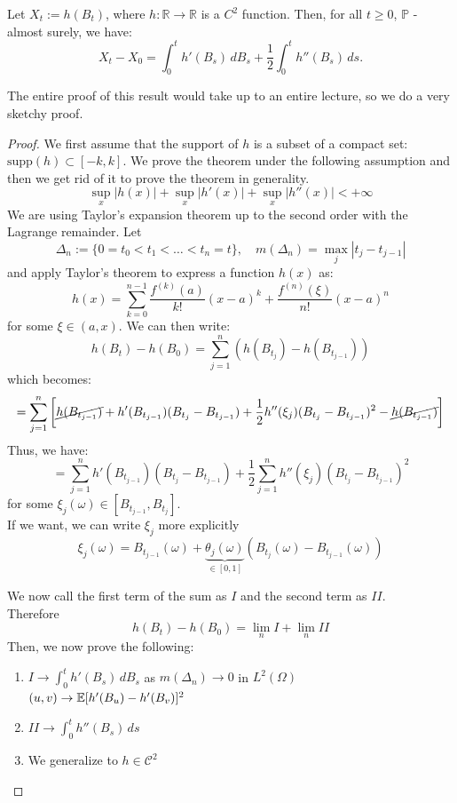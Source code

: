 \begin{ThBox}
    \begin{Th} 
     Let \( X_t := h(B_t) \), where \( h: \mathbb{R} \to \mathbb{R} \) is a \( C^2 \) function. Then, for all \( t \geq 0 \), $\mathbb{P}$ - almost surely, we have:
\[
X_t - X_0 = \int_0^t h'(B_s) \, dB_s + \frac{1}{2} \int_0^t h''(B_s) \, ds.
\]
\end{Th}
\end{ThBox}
The entire proof of this result would take up to an entire lecture, so we do a very sketchy proof.
\begin{ProofBox}
    \begin{proof}
    We first assume that the support of $h$ is a subset of a compact set: $\text{supp}(h) \subset [-k,k]$. We prove the theorem under the following assumption and then we get rid of it to prove the theorem in generality. 
    \begin{equation*}
        \sup_x |h(x)| + \sup_x |h'(x)| + \sup_x |h''(x)| < +\infty
    \end{equation*}
    We are using Taylor's expansion theorem up to the second order with the Lagrange remainder. Let
\[
\Delta_n := \{ 0 = t_0 < t_1 < \dots < t_n = t \}, \quad m(\Delta_n) = \max_j |t_j - t_{j-1}|
\]
and apply Taylor’s theorem to express a function \( h(x) \) as:
\[
h(x) = \sum_{k=0}^{n-1} \frac{f^{(k)}(a)}{k!}(x - a)^k + \frac{f^{(n)}(\xi)}{n!}(x - a)^n
\]
for some \( \xi \in (a,x) \).
We can then write:
\[
h(B_t) - h(B_0) = \sum_{j=1}^{n} (h(B_{t_j}) - h(B_{t_{j-1}}))
\]
which becomes:
\[
= \sum_{j=1}^{n} \left[ \cancel{h(B_{t_{j-1}})} + h'(B_{t_{j-1}})(B_{t_j} - B_{t_{j-1}}) + \frac{1}{2} h''(\xi_j)(B_{t_j} - B_{t_{j-1}})^2 - \cancel{h(B_{t_{j-1}})} \right]
\]
Thus, we have:
\[
= \sum_{j=1}^{n} h'(B_{t_{j-1}})(B_{t_j} - B_{t_{j-1}}) + \frac{1}{2} \sum_{j=1}^{n} h''(\xi_j)(B_{t_j} - B_{t_{j-1}})^2
\]
for some \( \xi_j(\omega) \in [B_{t_{j-1}}, B_{t_j}] \).\\
If we want, we can write $\xi_j$ more explicitly
\begin{equation*}
    \xi_j(\omega) = B_{t_{j-1}}(\omega) + \underbrace{\theta_j(\omega)}_{\in [0,1]} (B_{t_j}(\omega) - B_{t_{j-1}}(\omega))
\end{equation*}

We now call the first term of the sum as \( I \) and the second term as \( II \). \\
Therefore
\begin{equation*}
    h(B_t) - h(B_0) = \lim_n I + \lim_n II
\end{equation*}
Then, we now prove the following:
\begin{enumerate}
    \item \( I \to \int_0^t h'(B_s) \, dB_s \) as \( m(\Delta_n) \to 0 \) in $L^2(\Omega)$ \\
    \((u,v) \rightarrow \mathbb{E}[h'(B_u) - h'(B_v)]^2\)
    \item \( II \to \int_0^t h''(B_s) \, ds \)
    \item We generalize to \( h \in \mathcal{C}^2 \)
\end{enumerate}


\end{proof}
\end{ProofBox}
